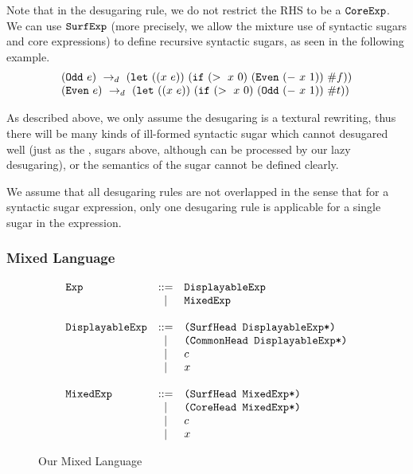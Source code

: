 Note that in the desugaring rule, we do not restrict the RHS to be a $\mbox{\tt CoreExp}$. We can use $\mbox{\tt SurfExp}$ (more precisely, we allow the mixture use of syntactic sugars and core expressions) to define recursive syntactic sugars, as seen in the following example.
\[
\begin{array}{l}
(\mbox{\tt Odd}~e) ~\rightarrow_d~ (\mbox{\tt let}~((x~e))~(\mbox{\tt if}~(>~x~0)~(\mbox{\tt Even}~(-~x~1))~\#f))\\
(\mbox{\tt Even}~e) ~\rightarrow_d~ (\mbox{\tt let}~((x~e))~(\mbox{\tt if}~(>~x~0)~(\mbox{\tt Odd}~(-~x~1))~\#t))
\end{array}
\]

As described above, we only assume the desugaring is a textural rewriting, thus there will be many kinds of ill-formed syntactic sugar which cannot desugared well (just as the ,  sugars above, although can be processed by our lazy desugaring), or the semantics of the sugar cannot be defined clearly. 

We assume that all desugaring rules are not overlapped in the sense that for a syntactic sugar expression, only one desugaring rule is applicable for a single sugar in the expression.


\subsubsection{Mixed Language}
\begin{figure}[t]
\begin{centering}
{\footnotesize
\[
			\begin{array}{lcl}
			\mbox{\tt Exp} &::=& \mbox{\tt DisplayableExp}\\
			&|& \mbox{\tt MixedExp}\\
			\\
			\mbox{\tt DisplayableExp} &::=& \mbox{\tt (SurfHead~DisplayableExp*)}\\
			&|& \mbox{\tt (CommonHead~DisplayableExp*)}\\
			&|& c\\
			&|& x\\
			\\
			\mbox{\tt MixedExp} &::=& \mbox{\tt (SurfHead~MixedExp*)}\\
			&|& \mbox{\tt (CoreHead~MixedExp*)}\\
			&|& c\\
			&|& x\\
			\end{array}
			\]
}

\end{centering}
\caption{Our Mixed Language}
\label{fig:mix}
\end{figure}

